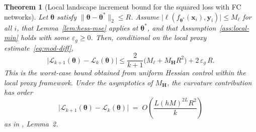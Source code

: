 \documentclass[10pt,letterpaper]{article}
\newtheorem{theorem}{Theorem}
\theoremstyle{definition}
\begin{document}
\begin{theorem}[Local landscape increment bound for the squared loss with FC networks]\label{thm:landscape-mse}
Let $\boldsymbol{\theta}$ satisfy $\|\boldsymbol{\theta}-\boldsymbol{\theta}^*\|_2\le R$.
Assume $\bigl|\ell(f_{\boldsymbol{\theta}^*}(\mathbf{x}_i),\mathbf{y}_i)\bigr|\le M_{\ell}$ for all $i$, that Lemma~\ref{lem:hess-mse} applies at $\boldsymbol{\theta}^*$, and that Assumption~\ref{ass:local-min} holds with some $\varepsilon_g\ge 0$.
Then, conditional on the local proxy estimate~\eqref{eq:mod-diff},
\begin{equation}\label{eq:thm-bound}
  \bigl|\mathcal{L}_{k+1}(\boldsymbol{\theta}) - \mathcal{L}_k(\boldsymbol{\theta})\bigr|
  \le \frac{2}{k+1}\bigl( M_{\ell} + M_{\mathbf{H}} R^2 \bigr) + 2\,\varepsilon_g\, R .
\end{equation}
This is the worst-case bound obtained from uniform Hessian control within the local proxy framework. Under the asymptotics of $M_{\mathbf{H}}$, the curvature contribution has order
\begin{equation}\label{eq:rate}
  \bigl|\mathcal{L}_{k+1}(\boldsymbol{\theta}) - \mathcal{L}_k(\boldsymbol{\theta})\bigr|
  \;=\; O\!\left(\frac{L(hM)^{2L} R^2}{k}\right)
\end{equation}
as in \cite{kiselev2024hessian}, Lemma~2.


\end{theorem}
\end{document}
